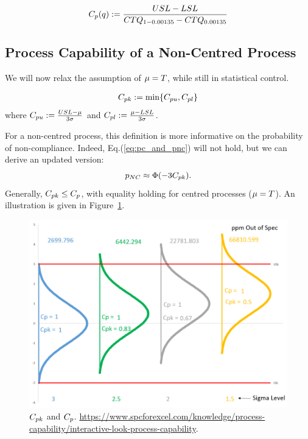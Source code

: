 \begin{definition}[$\cpq$]
\begin{align}
	C_p(q):= \frac{USL-LSL}{CTQ_{1-0.00135}-CTQ_{0.00135}}
\end{align}
\end{definition}






\subsection{Process Capability of a Non-Centred Process}
We will now relax the assumption of $\mu=T$, while still in statistical control.

\begin{definition}[$\cpk$]
\begin{align}
	C_{pk}:= \min\{ C_{pu},C_{pl} \}
\end{align}
where $C_{pu}:= \frac{USL- \mu}{3 \sigma}$ and $C_{pl}:= \frac{\mu-LSL}{3 \sigma}$.
\end{definition}
For a non-centred process, this definition is more informative on the probability of non-compliance.
Indeed, Eq.(\ref{eq:pc_and_pnc}) will not hold, but we can derive an updated version:
\begin{align}
	 p_{NC} \approx \Phi(-3 C_{pk}).
\end{align}
Generally, $C_{pk} \leq C_p$, with equality holding for centred processes ($\mu=T$).
An illustration is given in Figure~\ref{fig:cpk}.


\begin{figure}
\centering
\includegraphics[height=0.3\textheight]{art/Cpk_same_sigma_varying_avg}
\caption[$\cpk$ and $\cp$]{$\cpk$ and $\cp$. \newline
\url{https://www.spcforexcel.com/knowledge/process-capability/interactive-look-process-capability}.}
\label{fig:cpk}
\end{figure}



